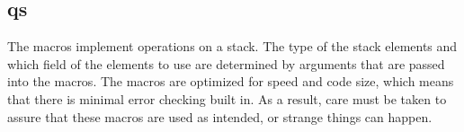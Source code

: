 %
%
%
%
%              

\subsection{qs}
\label{qs}

The  macros implement operations on a stack.  The type of the
stack elements and which field of the elements to use are determined by
arguments that are passed into the macros.  The macros are optimized for speed
and code size, which means that there is minimal error checking built in.  As a
result, care must be taken to assure that these macros are used as intended, or
strange things can happen.

